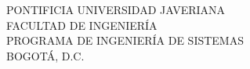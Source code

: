 \begin{titlepage}
    \begin{center}
        \vspace*{1cm}

        \Huge
        \textbf{\codigoproyecto}

        \vspace{0.5cm}
        \LARGE
        
        \Huge
        \thetitle
        
        \vspace{0.5cm}
        \LARGE
        
        \vspace{3.5cm}
        
        \theauthor
        
        \vfill

        \large
        PONTIFICIA UNIVERSIDAD JAVERIANA \\
        \vspace{0.5cm}
        FACULTAD DE INGENIERÍA \\
        \vspace{0.5cm}
        PROGRAMA DE INGENIERÍA DE SISTEMAS \\
        \vspace{0.5cm}
        BOGOTÁ, D.C. \\
        \vspace{0.5cm}
        \anioproyecto
        
    \end{center}
\end{titlepage}

